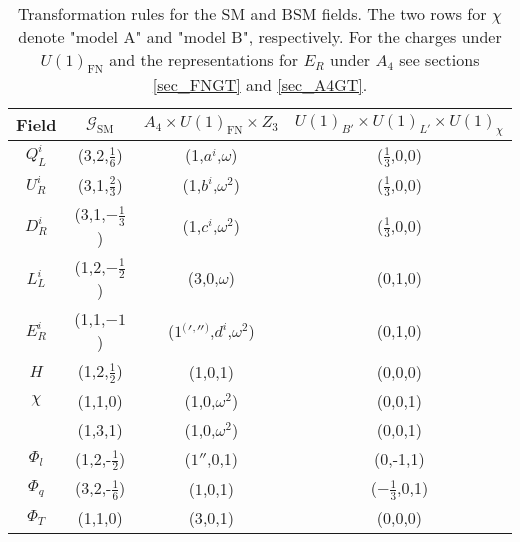 \begin{table}[t]
 \begin{tabular}{c|c|c|c}
  Field & $\mathcal{G}_\text{SM}$ & $A_4 \times U(1)_\text{FN} \times Z_3$ & $U(1)_{B'}\times U(1)_{L'}\times U(1)_\chi$\\
  \hline
  $Q^i_L$ & (3,2,$\frac16$) & (1,$a^i$,$\omega$) & ($\frac13$,0,0)\\
  $U^i_R$ & (3,1,$\frac23$) & (1,$b^i$,$\omega^2$)& ($\frac13$,0,0)\\
  $D^i_R$ & (3,1,$-\frac13$) & (1,$c^i$,$\omega^2$)& ($\frac13$,0,0)\\
  $L^i_L$ & (1,2,$-\frac12$) & (3,0,$\omega$)& (0,1,0)\\
  $E^i_R$ & (1,1,$-1$) & ($1 {^(} {'} {^,} '' {^)} $,$d^i$,$\omega^2$)& (0,1,0)\\
  $H$ & (1,2,$\frac12$) & (1,0,1)& (0,0,0)\\
  \hline
  $\chi$ & (1,1,0) & (1,0,$\omega^2$)& (0,0,1)\\
 & (1,3,1) & (1,0,$\omega^2$)&(0,0,1)\\
  $\Phi_l$ & (1,2,-$\frac12$) & ($1''$,0,1)& (0,-1,1)\\
  $\Phi_q$ & (3,2,-$\frac16$) & ($1$,0,1)& ($-\frac13$,0,1)\\
  \hline
  $\Phi_T$ & (1,1,0) & ($3$,0,1)& (0,0,0)\\

 \end{tabular}
\caption{Transformation rules for the SM and BSM fields. The two rows for $\chi$ denote "model A" and "model B", respectively. For the charges under $U(1)_\text{FN}$ and the representations for $E_R$ under $A_4$ 
see sections \ref{sec_FNGT} and \ref{sec_A4GT}.}
\label{tab_models}
\end{table}
